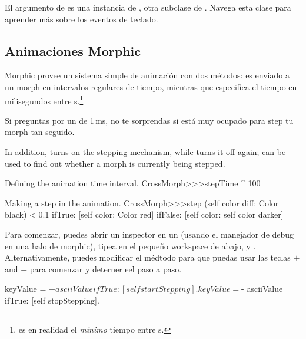 \documentclass[a4paper,10pt,twoside]{book}
\begin{document}
El argumento  de  es una instancia de , otra subclase de . Navega esta clase para aprender m\'as sobre los eventos de teclado. 

\subsection{Animaciones Morphic}

Morphic provee un sistema simple de animaci\'on con dos m\'etodos:  es enviado a un morph en intervalos regulares de tiempo, mientras que  especifica el tiempo en milisegundos entre s.\footnote{ es en realidad el \emph{m\'inimo} tiempo entre s.}

Si preguntas por un  de 1\,ms, no te sorprendas si \pharo est\'a muy ocupado para step tu morph tan seguido.

In addition, 
 turns on the stepping mechanism, while  turns it off again;   can be used to find out whether a morph is currently being stepped.

\begin{method}{Defining the animation time interval.}
CrossMorph>>>stepTime
	^ 100
\end{method}
\begin{method}{Making a step in the animation.}
CrossMorph>>>step
	(self color diff: Color black) < 0.1
		ifTrue: [self color: Color red]
		ifFalse: [self color: self color darker]
\end{method}
\noindent

Para comenzar, puedes abrir un inspector en un   (usando el manejador de debug \debugHandle{} en una halo de morphic), tipea  en el pequeño workspace de abajo, y .
Alternativamente, puedes modificar el m\'edtodo   para que puedas usar las teclas $+$ and $-$  para comenzar y deterner eel paso a paso.



\begin{code}{}
	keyValue = $+ asciiValue 
		ifTrue: [self startStepping].
	keyValue = $- asciiValue
		ifTrue: [self stopStepping].
\end{code}
\end{document}
